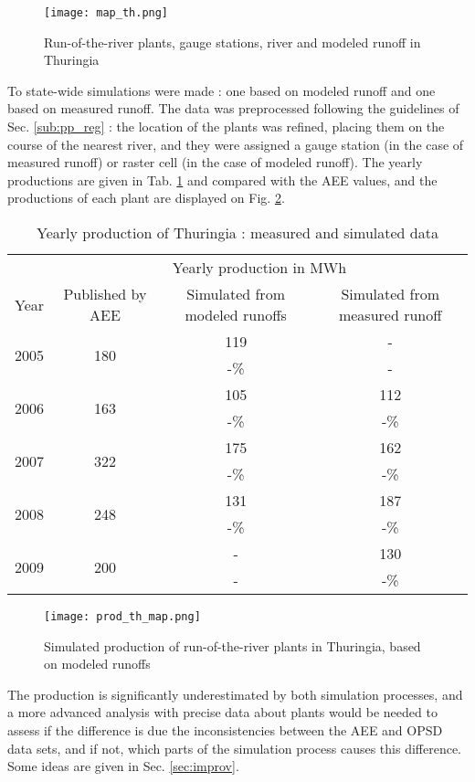 \begin{figure}[H]
\centering
\texttt{[image: map\_th.png]}
\caption{Run-of-the-river plants, gauge stations, river and modeled runoff in Thuringia}
\label{map_th}
\end{figure}

To state-wide simulations were made : one based on modeled runoff and one based on measured runoff. The data was preprocessed following the guidelines of Sec. \ref{sub:pp_reg} : the location of the plants was refined, placing them on the course of the nearest river, and they were assigned a gauge station (in the case of measured runoff) or raster cell (in the case of modeled runoff). The yearly productions are given in Tab. \ref{res_th} and compared with the AEE values, and the productions of each plant are displayed on Fig. \ref{prod_th_map}.

\begin{table}[H]
\footnotesize
 \centering
 \caption{Yearly production of Thuringia : measured and simulated data}
 \label{res_th}
 \begin{tabular}{|l|ccc|}
 \hline
  &\multicolumn{3}{c|}{Yearly production in MWh}\\
  Year&Published by AEE&Simulated from modeled runoffs&Simulated from measured runoff\\
  \hline \hline
  \multirow{2}{*}{2005}&\multirow{2}{*}{180}&119&-\\
  &&-\unit[34]{\%}&-\\
  \hline
  \multirow{2}{*}{2006}&\multirow{2}{*}{163}&105&112\\
  &&-\unit[36]{\%}&-\unit[31]{\%}\\
  \hline
  \multirow{2}{*}{2007}&\multirow{2}{*}{322}&175&162\\
  &&-\unit[46]{\%}&-\unit[50]{\%}\\
  \hline
  \multirow{2}{*}{2008}&\multirow{2}{*}{248}&131&187\\
  &&-\unit[47]{\%}&-\unit[25]{\%}\\
  \hline
  \multirow{2}{*}{2009}&\multirow{2}{*}{200}&-&130\\
  &&-&-\unit[35]{\%}\\
  \hline
 \end{tabular}
\end{table}

\begin{figure}[H]
\centering
\texttt{[image: prod\_th\_map.png]}
\caption{Simulated production of run-of-the-river plants in Thuringia, based on modeled runoffs}
\label{prod_th_map}
\end{figure}
 
The production is significantly underestimated by both simulation processes, and a more advanced analysis with precise data about plants would be needed to assess if the difference is due the inconsistencies between the AEE and OPSD data sets, and if not, which parts of the simulation process causes this difference. Some ideas are given in Sec. \ref{sec:improv}.